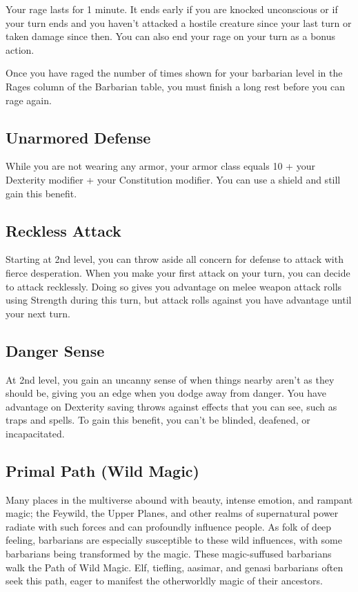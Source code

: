 {Your rage lasts for 1 minute. It ends early if you are knocked unconscious or if your turn ends and you haven't attacked a hostile creature since your last turn or taken damage since then. You can also end your rage on your turn as a bonus action.

Once you have raged the number of times shown for your barbarian level in the Rages column of the Barbarian table, you must finish a long rest before you can rage again.
\subsection*{Unarmored Defense}
While you are not wearing any armor, your armor class equals 10 + your Dexterity modifier + your Constitution modifier. You can use a shield and still gain this benefit.
\subsection*{Reckless Attack}
Starting at 2nd level, you can throw aside all concern for defense to attack with fierce desperation. When you make your first attack on your turn, you can decide to attack recklessly. Doing so gives you advantage on melee weapon attack rolls using Strength during this turn, but attack rolls against you have advantage until your next turn.
\subsection*{Danger Sense}
At 2nd level, you gain an uncanny sense of when things nearby aren't as they should be, giving you an edge when you dodge away from danger. You have advantage on Dexterity saving throws against effects that you can see, such as traps and spells. To gain this benefit, you can't be blinded, deafened, or incapacitated.
\subsection*{Primal Path (Wild Magic)}
Many places in the multiverse abound with beauty, intense emotion, and rampant magic; the Feywild, the Upper Planes, and other realms of supernatural power radiate with such forces and can profoundly influence people. As folk of deep feeling, barbarians are especially susceptible to these wild influences, with some barbarians being transformed by the magic. These magic-suffused barbarians walk the Path of Wild Magic. Elf, tiefling, aasimar, and genasi barbarians often seek this path, eager to manifest the otherworldly magic of their ancestors.
}
